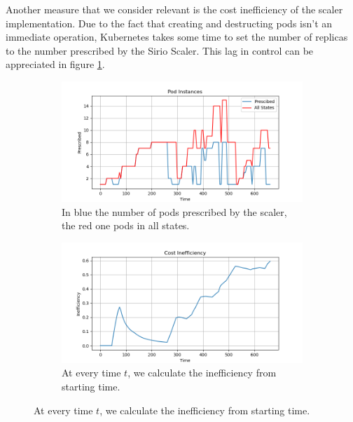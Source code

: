 Another measure that we consider relevant is the cost inefficiency of the scaler implementation. Due to the fact that creating and destructing pods isn't an immediate operation, Kubernetes takes some time to set the number of replicas to the number prescribed by the Sirio Scaler. This lag in control can be appreciated in figure \ref{fig:uniform_pods}.
\begin{figure}[H]
    \centering
    \begin{subfigure}{0.85\textwidth}
        \centering
        \includegraphics[width=\textwidth]{images/Uniform/pods.png}
        \caption{In blue the number of pods prescribed by the scaler, the red one pods in all states.}
        \label{fig:uniform_pods}
    \end{subfigure}
    \begin{subfigure}{0.85\textwidth}
        \includegraphics[width=\linewidth]{images/Uniform/inefficiency_cumulative.png}
        \caption{At every time $t$, we calculate the inefficiency from starting time.}
        \label{fig:uniform_inefficiency}
    \end{subfigure}
\end{figure}

